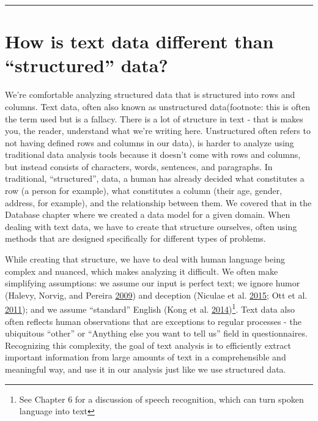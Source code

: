 \documentclass[]{krantz}
\begin{document}
\begin{center}\rule{0.5\linewidth}{\linethickness}\end{center}

\section{\texorpdfstring{How is text data different than ``structured''
data?}{How is text data different than structured data?}}\label{how-is-text-data-different-than-structured-data}

We're comfortable analyzing structured data that is structured into rows
and columns. Text data, often also known as unstructured data(footnote:
this is often the term used but is a fallacy. There is a lot of
structure in text - that is makes you, the reader, understand what we're
writing here. Unstructured often refers to not having defined rows and
columns in our data), is harder to analyze using traditional data
analysis tools because it doesn't come with rows and columns, but
instead consists of characters, words, sentences, and paragraphs. In
traditional, ``structured'', data, a human has already decided what
constitutes a row (a person for example), what constitutes a column
(their age, gender, address, for example), and the relationship between
them. We covered that in the Database chapter where we created a data
model for a given domain. When dealing with text data, we have to create
that structure ourselves, often using methods that are designed
specifically for different types of problems.

While creating that structure, we have to deal with human language being
complex and nuanced, which makes analyzing it difficult. We often make
simplifying assumptions: we assume our input is perfect text; we ignore
humor (Halevy, Norvig, and Pereira
\protect\hyperlink{ref-halevy-09}{2009}) and deception (Niculae et al.
\protect\hyperlink{ref-niculae-15}{2015}; Ott et al.
\protect\hyperlink{ref-ott-11}{2011}); and we assume ``standard''
English (Kong et al. \protect\hyperlink{ref-kong-14}{2014})\footnote{See
  Chapter 6 for a discussion of speech recognition, which can turn
  spoken language into text}. Text data also often reflects human
observations that are exceptions to regular processes - the ubiquitous
``other'' or ``Anything else you want to tell us'' field in
questionnaires. Recognizing this complexity, the goal of text analysis
is to efficiently extract important information from large amounts of
text in a comprehensible and meaningful way, and use it in our analysis
just like we use structured data.
\end{document}
